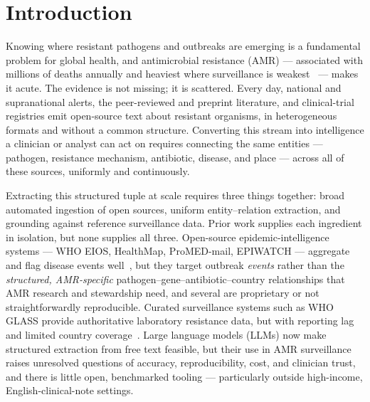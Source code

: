 \documentclass[10pt]{article}
\begin{document}
\vspace{0.6em}

\section{Introduction}
Knowing where resistant pathogens and outbreaks are emerging is a fundamental
problem for global health, and antimicrobial resistance (AMR) --- associated with
millions of deaths annually and heaviest where surveillance is weakest~\cite{gbd}
--- makes it acute. The evidence is not missing; it is scattered. Every day,
national and supranational alerts, the peer-reviewed and preprint literature, and
clinical-trial registries emit open-source text about resistant organisms, in
heterogeneous formats and without a common structure. Converting this stream into
intelligence a clinician or analyst can act on requires connecting the same entities
--- pathogen, resistance mechanism, antibiotic, disease, and place --- across all of
these sources, uniformly and continuously.

Extracting this structured tuple at scale requires three things together: broad
automated ingestion of open sources, uniform entity--relation extraction, and
grounding against reference surveillance data. Prior work supplies each ingredient
in isolation, but none supplies all three. Open-source epidemic-intelligence systems
--- WHO EIOS, HealthMap, ProMED-mail, EPIWATCH --- aggregate and flag disease
events well~\cite{eios,healthmap,promed,epiwatch}, but they target outbreak
\emph{events} rather than the \emph{structured, AMR-specific}
pathogen--gene--antibiotic--country relationships that AMR research and stewardship
need, and several are proprietary or not straightforwardly reproducible. Curated
surveillance systems such as WHO GLASS provide authoritative laboratory resistance
data, but with reporting lag and limited country coverage~\cite{glass}. Large
language models (LLMs) now make structured extraction from free text feasible, but
their use in AMR surveillance raises unresolved questions of accuracy,
reproducibility, cost, and clinician trust, and there is little open, benchmarked
tooling --- particularly outside high-income, English-clinical-note
settings.%
\end{document}
